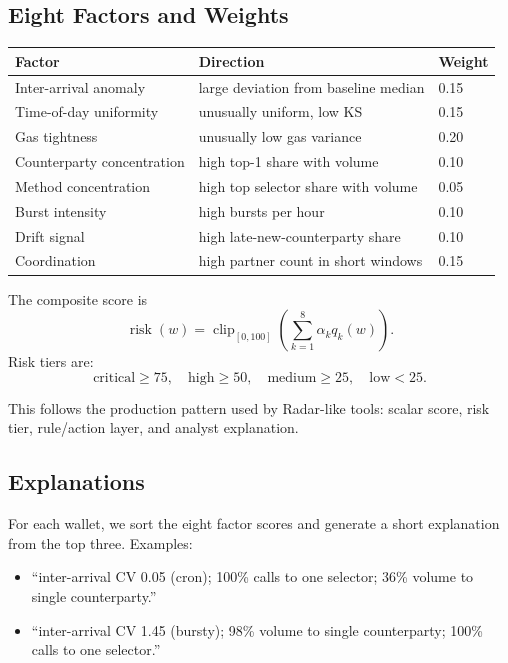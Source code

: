\documentclass[11pt]{article}
\newcommand{\risk}{\operatorname{risk}}
\begin{document}
\subsection{Eight Factors and Weights}

\begin{center}
\begin{tabular}{lll}
\toprule
Factor & Direction & Weight \\
\midrule
Inter-arrival anomaly & large deviation from baseline median & 0.15 \\
Time-of-day uniformity & unusually uniform, low KS & 0.15 \\
Gas tightness & unusually low gas variance & 0.20 \\
Counterparty concentration & high top-1 share with volume & 0.10 \\
Method concentration & high top selector share with volume & 0.05 \\
Burst intensity & high bursts per hour & 0.10 \\
Drift signal & high late-new-counterparty share & 0.10 \\
Coordination & high partner count in short windows & 0.15 \\
\bottomrule
\end{tabular}
\end{center}

The composite score is
\[
  \risk(w)=
  \operatorname{clip}_{[0,100]}\left(
    \sum_{k=1}^{8}\alpha_k q_k(w)
  \right).
\]
Risk tiers are:
\[
  \text{critical}\geq 75,\quad
  \text{high}\geq 50,\quad
  \text{medium}\geq 25,\quad
  \text{low}<25.
\]

This follows the production pattern used by Radar-like tools: scalar score,
risk tier, rule/action layer, and analyst explanation.

\subsection{Explanations}

For each wallet, we sort the eight factor scores and generate a short
explanation from the top three.  Examples:

\begin{itemize}
  \item ``inter-arrival CV 0.05 (cron); 100\% calls to one selector; 36\%
        volume to single counterparty.''
  \item ``inter-arrival CV 1.45 (bursty); 98\% volume to single counterparty;
        100\% calls to one selector.''
\end{itemize}
\end{document}
